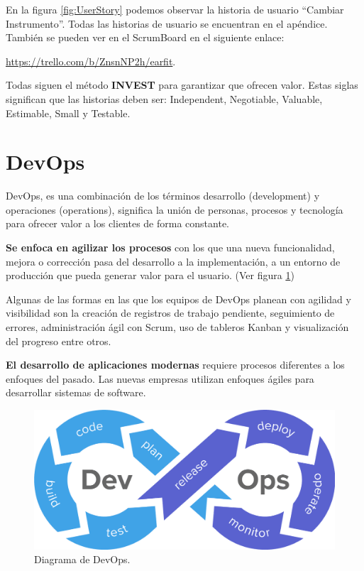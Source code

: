 \documentclass[12pt,twoside,titlepage]{report}
\begin{document}
En la figura \ref{fig:UserStory} podemos observar la historia de usuario ``Cambiar Instrumento''. Todas las historias de usuario se encuentran en el apéndice. También se pueden ver en el ScrumBoard en el siguiente enlace: 

\url{https://trello.com/b/ZnsnNP2h/earfit}.

Todas siguen el método \textbf{INVEST} para garantizar que ofrecen valor. Estas siglas significan que las historias deben ser: Independent, Negotiable, Valuable, Estimable, Small y Testable.

\section{DevOps}

DevOps, es una combinación de los términos desarrollo (development) y operaciones (operations), significa la unión de personas, procesos y tecnología para ofrecer valor a los clientes de forma constante.

\textbf{Se enfoca en agilizar los procesos} con los que una nueva funcionalidad, mejora o corrección pasa del desarrollo a la implementación, a un entorno de producción que pueda generar valor para el usuario.
(Ver figura \ref{fig:DevOps})

Algunas de las formas en las que los equipos de DevOps planean con agilidad y visibilidad son la creación de registros de trabajo pendiente, seguimiento de errores, administración ágil con Scrum, uso de tableros Kanban y visualización del progreso entre otros.

\textbf{El desarrollo de aplicaciones modernas} requiere procesos diferentes a los enfoques del pasado. Las nuevas empresas utilizan enfoques ágiles para desarrollar sistemas de software.

\begin{figure}[H]
    \centering
    \includegraphics[scale=0.2]{DevOps/DevOps}
    \caption{Diagrama de DevOps.}
    \label{fig:DevOps}
\end{figure}
\end{document}
